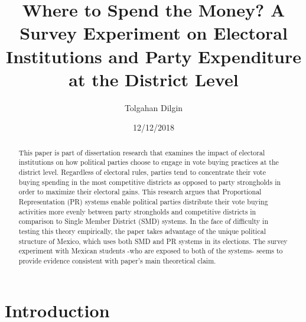 \documentclass{article}
\begin{document}

	\title{Where to Spend the Money? A Survey Experiment on Electoral Institutions and Party Expenditure at the District Level}
	\author{Tolgahan Dilgin}
	\date{12/12/2018}
	\maketitle
	
\begin{abstract}
   This paper is part of dissertation research that examines the impact of electoral institutions on how political parties choose to engage in vote buying practices at the district level. Regardless of electoral rules, parties tend to concentrate their vote buying spending in the most competitive districts as opposed to party strongholds in order to maximize their electoral gains. This research argues that Proportional Representation (PR) systems enable political parties distribute their vote buying activities more evenly between party strongholds and competitive districts in comparison to Single Member District (SMD) systems. In the face of difficulty in testing this theory empirically, the paper takes advantage of the unique political structure of Mexico, which uses both SMD and PR systems in its elections. The survey experiment with Mexican students -who are exposed to both of the systems- seems to provide evidence consistent with paper's main theoretical claim.
\end{abstract}

\section{Introduction}
\end{document}
